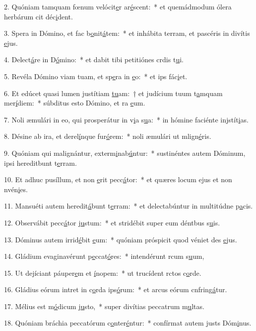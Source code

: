 2. Quóniam tamquam fœnum velócit\uline{e}r ar\uline{é}scent:~* et quemádmodum ólera herbárum cit déc\uline{i}dent.\par 
3. Spera in Dómino, et fac b\uline{o}nit\uline{á}tem:~* et inhábita terram, et pascéris in divítis \uline{e}jus.\par 
4. Delect\uline{á}re in D\uline{ó}mino:~* et dabit tibi petitiónes crdis t\uline{u}i.\par 
5. Revéla Dómino viam tuam, et sp\uline{e}ra in \uline{e}o:~* et ips fác\uline{i}et.\par 
6. Et edúcet quasi lumen justítiam \uline{tu}am:~† et judícium tuum t\uline{a}mquam mer\uline{í}diem:~* súbditus esto Dómino, et ra \uline{e}um.\par 
7. Noli æmulári in eo, qui prosperátur in v\uline{i}a s\uline{u}a:~* in hómine faciénte injstít\uline{i}as.\par 
8. Désine ab ira, et derel\uline{í}nque fur\uline{ó}rem:~* noli æmulári ut mlign\uline{é}ris.\par 
9. Quóniam qui malignántur, exterm\uline{i}nab\uline{ú}ntur:~* sustinéntes autem Dóminum, ipsi hereditbunt t\uline{e}rram.\par 
10. Et adhuc pusíllum, et non \uline{e}rit pecc\uline{á}tor:~* et quæres locum ejus et non nvén\uline{i}es.\par 
11. Mansuéti autem heredit\uline{á}bunt t\uline{e}rram:~* et delectabúntur in multitúdne p\uline{a}cis.\par 
12. Observábit pecc\uline{á}tor j\uline{u}stum:~* et stridébit super eum déntbus s\uline{u}is.\par 
13. Dóminus autem irrid\uline{é}bit \uline{e}um:~* quóniam próspicit quod véniet des \uline{e}jus.\par 
14. Gládium evaginavérunt p\uline{e}ccat\uline{ó}res:~* intendérunt rcum s\uline{u}um,\par 
15. Ut dejíciant páuper\uline{e}m et \uline{í}nopem:~* ut trucídent rctos c\uline{o}rde.\par 
16. Gládius eórum intret in c\uline{o}rda ips\uline{ó}rum:~* et arcus eórum cnfring\uline{á}tur.\par 
17. Mélius est m\uline{ó}dicum j\uline{u}sto,~* super divítias peccatrum m\uline{u}ltas.\par 
18. Quóniam bráchia peccatórum c\uline{o}nter\uline{é}ntur:~* confírmat autem justs Dóm\uline{i}nus.\par 
